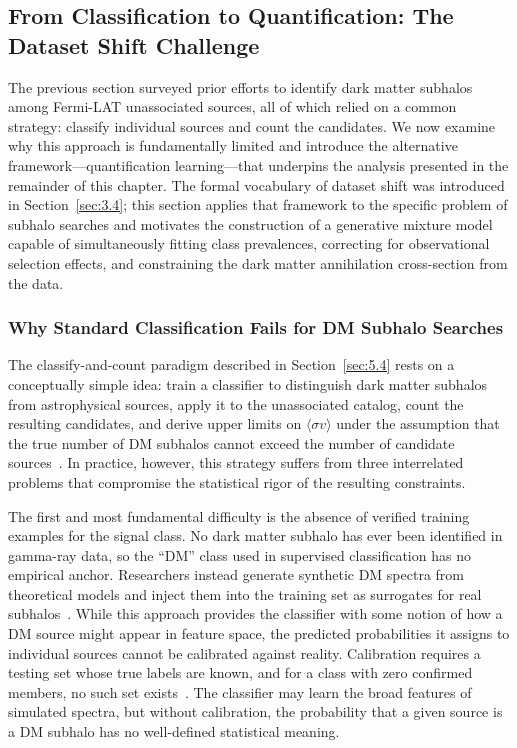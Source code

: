 ﻿\subsection{From Classification to Quantification: The Dataset Shift Challenge}
\label{sec:5.5}

The previous section surveyed prior efforts to identify dark matter subhalos among Fermi-LAT unassociated sources, all of which relied on a common strategy: classify individual sources and count the candidates.
We now examine why this approach is fundamentally limited and introduce the alternative framework---quantification learning---that underpins the analysis presented in the remainder of this chapter.
The formal vocabulary of dataset shift was introduced in Section~\ref{sec:3.4}; this section applies that framework to the specific problem of subhalo searches and motivates the construction of a generative mixture model capable of simultaneously fitting class prevalences, correcting for observational selection effects, and constraining the dark matter annihilation cross-section from the data.

\subsubsection{Why Standard Classification Fails for DM Subhalo Searches}
\label{sec:5.5.1}

The classify-and-count paradigm described in Section~\ref{sec:5.4} rests on a conceptually simple idea: train a classifier to distinguish dark matter subhalos from astrophysical sources, apply it to the unassociated catalog, count the resulting candidates, and derive upper limits on $\langle\sigma v\rangle$ under the assumption that the true number of DM subhalos cannot exceed the number of candidate sources~\cite{2019JCAP...07..020C, 2023JCAP...07..033B}.
In practice, however, this strategy suffers from three interrelated problems that compromise the statistical rigor of the resulting constraints.

The first and most fundamental difficulty is the absence of verified training examples for the signal class.
No dark matter subhalo has ever been identified in gamma-ray data, so the ``DM'' class used in supervised classification has no empirical anchor.
Researchers instead generate synthetic DM spectra from theoretical models and inject them into the training set as surrogates for real subhalos~\cite{2023JCAP...07..033B, 2023MNRAS.520.1348G}.
While this approach provides the classifier with some notion of how a DM source might appear in feature space, the predicted probabilities it assigns to individual sources cannot be calibrated against reality.
Calibration requires a testing set whose true labels are known, and for a class with zero confirmed members, no such set exists~\cite{Amerio:2025fhz}.
The classifier may learn the broad features of simulated spectra, but without calibration, the probability that a given source is a DM subhalo has no well-defined statistical meaning.

